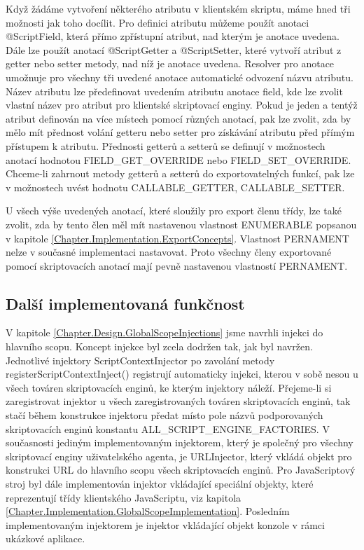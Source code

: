 Když žádáme vytvoření některého atributu v klientském skriptu, máme hned tři možnosti jak toho docílit. Pro definici atributu můžeme použít anotaci @ScriptField, která přímo zpřístupní atribut, nad kterým je anotace uvedena. Dále lze použít anotací @ScriptGetter a @ScriptSetter, které vytvoří atribut z getter nebo setter metody, nad níž je anotace uvedena. Resolver pro anotace umožnuje pro všechny tři uvedené anotace automatické odvození názvu atributu. Název atributu lze předefinovat uvedením atributu anotace field, kde lze zvolit vlastní název pro atribut pro klientské skriptovací enginy. Pokud je jeden a tentýž atribut definován na více místech pomocí různých anotací, pak lze zvolit, zda by mělo mít přednost volání getteru nebo setter pro získávání atributu před přímým přístupem k atributu. Přednosti getterů a setterů se definují v možnostech anotací hodnotou FIELD\_GET\_OVERRIDE nebo FIELD\_SET\_OVERRIDE. Chceme-li zahrnout metody getterů a setterů do exportovatelných funkcí, pak lze v možnostech uvést hodnotu CALLABLE\_GETTER, CALLABLE\_SETTER.

U všech výše uvedených anotací, které sloužily pro export členu třídy, lze také zvolit, zda by tento člen měl mít nastavenou vlastnost ENUMERABLE popsanou v kapitole \ref{Chapter.Implementation.ExportConcepts}. Vlastnost PERNAMENT nelze v současné implementaci nastavovat. Proto všechny členy exportované pomocí skriptovacích anotací mají pevně nastavenou vlastností PERNAMENT.

\subsection{Další implementovaná funkčnost}
\label{Chapter.Implementation.OtherFunctionality}

V kapitole \ref{Chapter.Design.GlobalScopeInjections} jsme navrhli injekci do hlavního scopu. Koncept injekce byl zcela dodržen tak, jak byl navržen. Jednotlivé injektory ScriptContextInjector po zavolání metody registerScriptContextInject() registrují automaticky injekci, kterou v sobě nesou u všech továren skriptovacích enginů, ke kterým injektory náleží. Přejeme-li si zaregistrovat injektor u všech zaregistrovaných továren skriptovacích enginů, tak stačí během konstrukce injektoru předat místo pole názvů podporovaných skriptovacích enginů konstantu  ALL\_SCRIPT\_ENGINE\_FACTORIES. V současnosti jediným implementovaným injektorem, který je společný pro všechny skriptovací enginy uživatelského agenta, je URLInjector, který vkládá objekt pro konstrukci URL do hlavního scopu všech skriptovacích enginů. Pro JavaScriptový stroj byl dále implementován injektor vkládající speciální objekty, které reprezentují třídy klientského JavaScriptu, viz kapitola \ref{Chapter.Implementation.GlobalScopeImplementation}. Posledním implementovaným injektorem je injektor vkládající objekt konzole v rámci ukázkové aplikace. 

